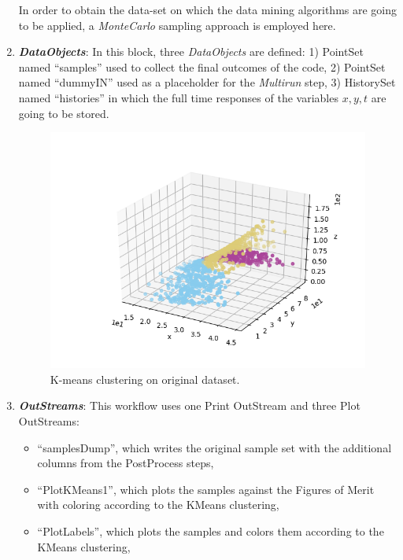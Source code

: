 \begin{enumerate}
  In order to obtain the data-set on which the data mining algorithms are going to be applied, a \textit{MonteCarlo} sampling approach is employed here.
   \item \textbf{\textit{DataObjects}}:
  In this block, three \textit{DataObjects} are defined:
  1) PointSet named ``samples'' used to collect the final outcomes of
  the code,
  2) PointSet named ``dummyIN'' used as a placeholder for the \textit{Multirun} step,
  3) HistorySet named ``histories'' in which the full time responses of the
  variables $x,y,t$ are going to be stored.
 \begin{figure}[h!]
  \centering
  \includegraphics[scale=0.7]{../../tests/framework/user_guide/DataMining/gold/dataMiningAnalysis/1-PlotLabels_dataMining.png}
  \caption{K-means clustering on original dataset.}
  \label{fig:KmeanOrigData}
 \end{figure}
   \item \textbf{\textit{OutStreams}}:
     This workflow uses one Print OutStream and three Plot OutStreams:
     \begin{itemize}
       \item ``samplesDump'', which writes the original sample set with the additional columns from the
         PostProcess steps,
       \item ``PlotKMeans1'', which plots the samples against the Figures of Merit with coloring according to the KMeans clustering,
       \item ``PlotLabels'', which plots the samples and colors them according to the KMeans clustering,

\end{itemize}
\end{enumerate}
